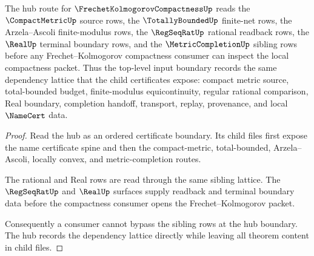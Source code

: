 \begin{theorem}
\label{thm:frechet-kolmogorov-hub-dependency-index}
The hub route for $\FrechetKolmogorovCompactnessUp$ reads the $\CompactMetricUp$ source rows, the $\TotallyBoundedUp$ finite-net rows, the Arzela--Ascoli finite-modulus rows, the $\RegSeqRatUp$ rational readback rows, the $\RealUp$ terminal boundary rows, and the $\MetricCompletionUp$ sibling rows before any Frechet--Kolmogorov compactness consumer can inspect the local compactness packet. Thus the top-level input boundary records the same dependency lattice that the child certificates expose: compact metric source, total-bounded budget, finite-modulus equicontinuity, regular rational comparison, Real boundary, completion handoff, transport, replay, provenance, and local $\NameCert$ data.
\end{theorem}
\begin{proof}
Read the hub as an ordered certificate boundary. Its child files first expose the name certificate spine and then the compact-metric, total-bounded, Arzela--Ascoli, locally convex, and metric-completion routes.

The rational and Real rows are read through the same sibling lattice. The $\RegSeqRatUp$ and $\RealUp$ surfaces supply readback and terminal boundary data before the compactness consumer opens the Frechet--Kolmogorov packet.

Consequently a consumer cannot bypass the sibling rows at the hub boundary. The hub records the dependency lattice directly while leaving all theorem content in child files.
\end{proof}
